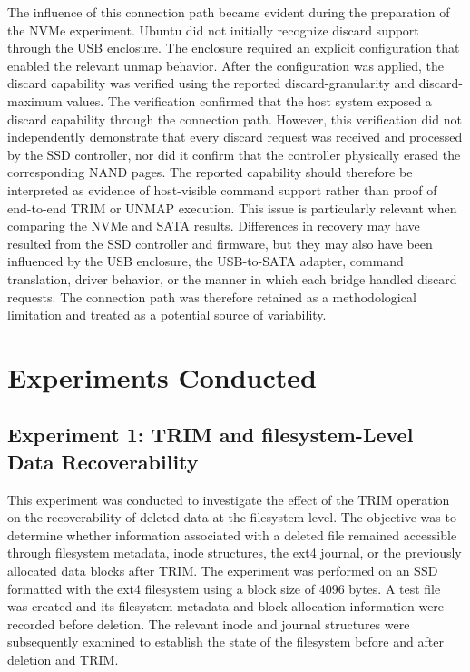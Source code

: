The influence of this connection path became evident during the preparation of the NVMe experiment. Ubuntu did not initially recognize discard support through the USB 
enclosure. The enclosure required an explicit configuration that enabled the relevant unmap behavior. After the configuration was applied, the discard capability was 
verified using the reported discard-granularity and discard-maximum values. The verification confirmed that the host system exposed a discard capability through the 
connection path. However, this verification did not independently demonstrate that every discard request was received and processed by the SSD controller, nor did it 
confirm that the controller physically erased the corresponding NAND pages. The reported capability should therefore be interpreted as evidence of host-visible command 
support rather than proof of end-to-end TRIM or UNMAP execution. This issue is particularly relevant when comparing the NVMe and SATA results. Differences in recovery 
may have resulted from the SSD controller and firmware, but they may also have been influenced by the USB enclosure, the USB-to-SATA adapter, command translation, 
driver behavior, or the manner in which each bridge handled discard requests. The connection path was therefore retained as a methodological limitation and treated as 
a potential source of variability.


\section{Experiments Conducted}

\subsection{Experiment 1: TRIM and filesystem-Level Data Recoverability}

This experiment was conducted to investigate the effect of the TRIM operation on the recoverability of deleted data at the filesystem level. The objective was to 
determine whether information associated with a deleted file remained accessible through filesystem metadata, inode structures, the ext4 journal, or the previously 
allocated data blocks after TRIM. The experiment was performed on an SSD formatted with the ext4 filesystem using a block size of 4096 bytes. A test file was created and 
its filesystem metadata and block allocation information were recorded before deletion. The relevant inode and journal structures were subsequently examined to establish 
the state of the filesystem before and after deletion and TRIM.

